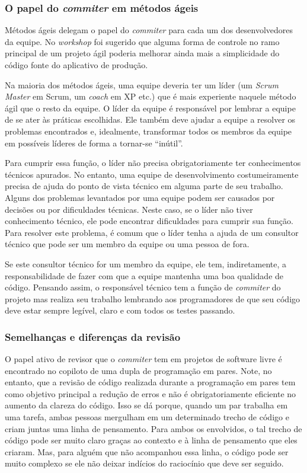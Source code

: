 \subsubsection{O papel do \emph{commiter} em métodos ágeis}

Métodos ágeis delegam o papel do \emph{commiter} para cada um dos
desenvolvedores da equipe. No \emph{workshop} foi sugerido que alguma
forma de controle no ramo principal de um projeto ágil poderia
melhorar ainda mais a simplicidade do código fonte do aplicativo de
produção.

Na maioria dos métodos ágeis, uma equipe deveria ter um líder (um
\emph{Scrum Master} em Scrum\cite{Schwaber2004}, um \emph{coach} em
XP\cite{XP01} etc.)  que é mais experiente naquele método ágil que o
resto da equipe. O líder da equipe é responsável por lembrar a equipe
de se ater às práticas escolhidas. Ele também deve ajudar a equipe a
resolver os problemas encontrados e, idealmente, transformar todos os
membros da equipe em possíveis líderes de forma a tornar-se
``inútil''.

Para cumprir essa função, o líder não precisa obrigatoriamente ter
conhecimentos técnicos apurados. No entanto, uma equipe de
desenvolvimento costumeiramente precisa de ajuda do ponto de vista
técnico em alguma parte de seu trabalho. Alguns dos problemas
levantados por uma equipe podem ser causados por decisões ou por
dificuldades técnicas. Neste caso, se o líder não tiver conhecimento
técnico, ele pode encontrar dificuldades para cumprir sua função. Para
resolver este problema, é comum que o líder tenha a ajuda de um
consultor técnico que pode ser um membro da equipe ou uma pessoa de
fora.

Se este consultor técnico for um membro da equipe, ele tem,
indiretamente, a responsabilidade de fazer com que a equipe mantenha
uma boa qualidade de código. Pensando assim, o responsável técnico tem
a função de \emph{commiter} do projeto mas realiza seu trabalho
lembrando aos programadores de que seu código deve estar sempre
legível, claro e com todos os testes passando.

\subsubsection{Semelhanças e diferenças da revisão}

O papel ativo de revisor que o \emph{commiter} tem em projetos de
software livre é encontrado no copiloto de uma dupla de programação em
pares. Note, no entanto, que a revisão de código realizada durante a
programação em pares tem como objetivo principal a redução de erros e
não é obrigatoriamente eficiente no aumento da clareza do código. Isso
se dá porque, quando um par trabalha em uma tarefa, ambas pessoas
mergulham em um determinado trecho de código e criam juntas uma linha
de pensamento. Para ambos os envolvidos, o tal trecho de código pode
ser muito claro graças ao contexto e à linha de pensamento que eles
criaram. Mas, para alguém que não acompanhou essa linha, o código pode
ser muito complexo se ele não deixar indícios do raciocínio que deve
ser seguido.

